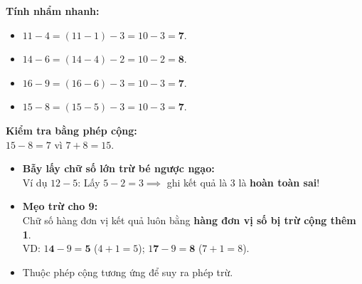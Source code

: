 \documentclass[11pt,a4paper]{article}
\begin{document}
\vspace{-1.5mm}
\noindent
\begin{minipage}[t]{0.49\textwidth}\vspace{0pt}
\begin{tcolorbox}[
  enhanced,
  colback=green!4!white,
  colframe=green!60!black,
  arc=2mm, boxrule=0.8pt,
  left=2mm, right=2mm, top=1.8mm, bottom=1.8mm,
  title={\footnotesize\bfseries\color{white}\faCheckCircle\ 4. Ví dụ thực hành chuẩn mực}
]
{\footnotesize
\textbf{Tính nhẩm nhanh:}\\
\begin{itemize}\setlength{\itemsep}{0.5pt}\setlength{\leftskip}{-2.5mm}
  \item $11 - 4 = (11 - 1) - 3 = 10 - 3 = \mathbf{7}$.
  \item $14 - 6 = (14 - 4) - 2 = 10 - 2 = \mathbf{8}$.
  \item $16 - 9 = (16 - 6) - 3 = 10 - 3 = \mathbf{7}$.
  \item $15 - 8 = (15 - 5) - 3 = 10 - 3 = \mathbf{7}$.
\end{itemize}
\textbf{Kiểm tra bằng phép cộng:}\\
$15 - 8 = 7$ vì $7 + 8 = 15$.
}
\end{tcolorbox}
\end{minipage}
\hfill
\begin{minipage}[t]{0.49\textwidth}\vspace{0pt}
\begin{tcolorbox}[
  enhanced,
  colback=red!4!white,
  colframe=red!75!black,
  arc=2mm, boxrule=0.8pt,
  left=2mm, right=2mm, top=1.8mm, bottom=1.8mm,
  title={\footnotesize\bfseries\color{white}\faExclamationTriangle\ 5. Mẹo tránh bẫy trắc nghiệm}
]
{\footnotesize
\begin{itemize}\setlength{\itemsep}{1pt}\setlength{\leftskip}{-2.5mm}
  \item \textbf{Bẫy lấy chữ số lớn trừ bé ngược ngạo:}\\
  Ví dụ $12 - 5$: Lấy $5 - 2 = 3 \implies$ ghi kết quả là 3 là \textbf{hoàn toàn sai}!
  \item \textbf{Mẹo trừ cho 9:}\\
  Chữ số hàng đơn vị kết quả luôn bằng \textbf{hàng đơn vị số bị trừ cộng thêm 1}.\\
  VD: $1\mathbf{4} - 9 = \mathbf{5}$ ($4 + 1 = 5$); $1\mathbf{7} - 9 = \mathbf{8}$ ($7 + 1 = 8$).
  \item Thuộc phép cộng tương ứng để suy ra phép trừ.
\end{itemize}
}
\end{tcolorbox}
\end{minipage}
\end{document}
